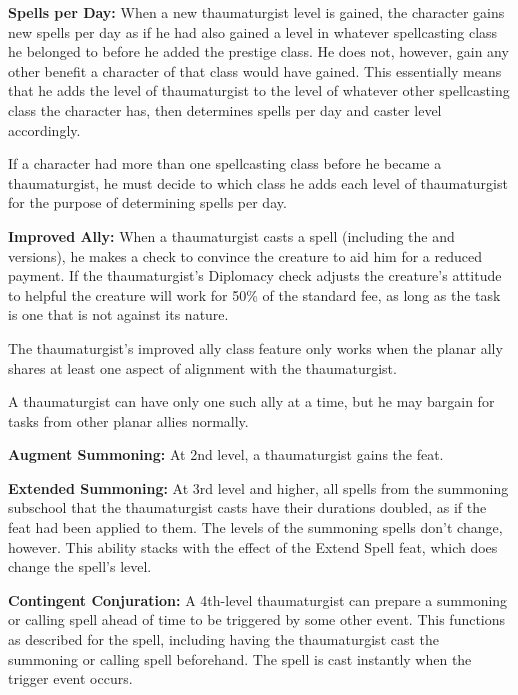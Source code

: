 \textbf{Spells per Day:} When a new thaumaturgist level is gained, the character 
gains new spells per day as if he had also gained a level in whatever spellcasting 
class he belonged to before he added the prestige class. He does not, however, 
gain any other benefit a character of that class would have gained. This essentially 
means that he adds the level of thaumaturgist to the level of whatever other spellcasting 
class the character has, then determines spells per day and caster level accordingly.

If a character had more than one spellcasting class before he became a thaumaturgist, 
he must decide to which class he adds each level of thaumaturgist for the purpose 
of determining spells per day.

\textbf{Improved Ally:} When a thaumaturgist casts a  spell 
(including the  and  versions), he makes a  
check to convince the creature to aid him for a reduced payment. If the thaumaturgist's 
Diplomacy check adjusts the creature's attitude to helpful the creature will work 
for 50\% of the standard fee, as long as the task is one that is not against its 
nature. 

The thaumaturgist's improved ally class feature only works when the planar ally 
shares at least one aspect of alignment with the thaumaturgist.

A thaumaturgist can have only one such ally at a time, but he may bargain for tasks 
from other planar allies normally.

\textbf{Augment Summoning:} At 2nd level, a thaumaturgist gains the  
feat.

\textbf{Extended Summoning:} At 3rd level and higher, all spells from the summoning 
subschool that the thaumaturgist casts have their durations doubled, as if the 
 feat had been applied to them. The levels of the summoning spells 
don't change, however. This ability stacks with the effect of the Extend Spell 
feat, which does change the spell's level.

\textbf{Contingent Conjuration:} A 4th-level thaumaturgist can prepare a summoning 
or calling spell ahead of time to be triggered by some other event. This functions 
as described for the  spell, including having the thaumaturgist 
cast the summoning or calling spell beforehand. The spell is cast instantly when 
the trigger event occurs. 

